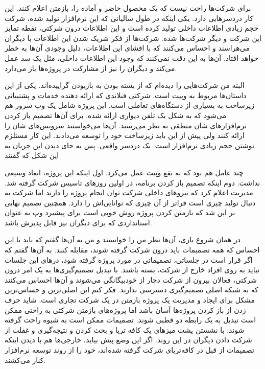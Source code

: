 برای شرکت‌ها راحت نیست که یک محصول حاضر و آماده را، بازمتن اعلام
کنند. این کار دردسرهایی دارد. یکی اینکه در طول سالیانی که این نرم‌افزار
تولید شده، شرکت حجم زیادی اطلاعات داخلی تولید کرده‌ است و این اطلاعات
درون شرکتی، نقطه تمایز این شرکت و دیگر شرکت‌ها شده. شرکت‌ها از فکر شریک
شدن این اطلاعات با دیگران می‌هراسند و احساس می‌کنند که با افشای این
اطلاعات، دلیل وجودی آن‌ها به خطر خواهد افتاد. آن‌ها به این دقت نمی‌کنند
که وجود این اطلاعات داخلی، مثل یک سد عمل می‌کند و دیگران را نیز از
مشارکت در پروژه‌ها باز می‌دارد.

البته من شرکت‌هایی را دیده‌ام که از بسته بودن به بازبودن گراییده‌اند. یکی
از این داستان‌ها مربوط به وپیت است. شرکتی فنلاندی که
ارائه دهنده خدمات و پشتیبانی زیرساخت به بسیاری از دستگاه‌های تعاملی
است. این پروژه شامل یک وب سرور هم می‌شود که به شکل یک تلفن دیواری ارائه
شده. برای آن‌ها تصمیم باز کردن نرم‌افزارهای شان منطقی به نظر
می‌رسید. آن‌ها می‌خواستند سرویس‌های شان را ارائه کنند ولی پیش از این باید
زیرساخت خود را توسعه می‌دادند. این کار مستلزم نوشتن حجم زیادی نرم‌افزار
است. یک دردسر واقعی. پس به جای دیدن این جریان به این شکل که
 گفتند

چند عامل هم بود که به نفع وپیت عمل می‌کرد. اول اینکه این پروژه، ابعاد
وسیعی نداشت. دوم اینکه تصمیم باز کردن برنامه، در اولین روزهای تاسیس
شرکت گرفته شد. مدیریت اعلام کرد که نیروهای داخلی شرکت توان انجام پروژه
را دارند اما شرکت به دنبال تولید چیزی است فراتر از آن چیزی که
توانایی‌اش را دارد. همچنین تصمیم نهایی بر این شد که بازمتن کردن پروژه
روش خوبی است برای پیشبرد وپ به عنوان استانداردی که برای دیگران نیز قابل
پذیرش باشد.

در همان شروع بازی، آن‌ها نظر من را خواستند و من به آن‌ها گفتم که باید با
این احساس که همه تصمیمات باید درون شرکت گرفته شوند، مقابله کنند. به
آن‌ها گفتم که اگر قرار است در جلساتی، تصمیماتی در مورد پروژه گرفته شود،
درهای این جلسات نباید به روی افراد خارج از شرکت، بسته باشند. با تبدیل
تصمیم‌گیری‌ها به یک امر درون شرکتی، فعالان بیرون از شرکت دچار از
خودبیگانگی می‌شوند و آن‌ها احساس می‌کنند که به شبکه اصلی تصمیم‌گیری دسترسی
ندارند. فکر کنم این اصلی‌ترین و حساس‌ترین مشکل برای ایجاد و مدیریت یک
پروژه بازمتن در یک شرکت تجاری است. شاید حرف زدن از باز کردن پروژه‌ها
آسان باشد اما پروژه‌های بازمتن شرکتی به راحتی ممکن است تبدیل به یک
رابطه دو قطبی  شوند. تصمیمات ممکن است به شیوه راحت
گرفته شوند: با نشستن پشت میزهای یک کافه تریا و بحث کردن و نتیجه‌گیری و
غفلت از شرکت دادن دیگران در این روند. اگر این وضع پیش بیاید، خارجی‌ها
هم با دیدن اینکه تصمیمات از قبل در کافه‌تریای شرکت گرفته شده‌اند، خود را
از روند توسعه نرم‌افزار کنار می‌کشند.

